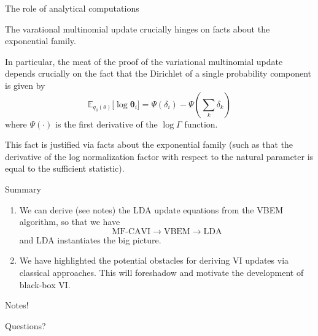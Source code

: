 \documentclass[10pt]{beamer}
\newcommand{\ds}{\displaystyle}
\newcommand{\+}[1]{\ensuremath{{\boldsymbol #1}}} %
\newcommand{\E}{\mathbb{E}}
\newcommand{\biggE}[2]{\E_{{#1}} \bigg[ {{#2}} \bigg]}
\begin{document}
\begin{frame}{The role of analytical computations}

The varational multinomial update crucially hinges on facts about the exponential family.  

In particular, the meat of the proof of the variational multinomial update depends crucially on the fact that the Dirichlet of a single probability component is given by
\begin{equation} \label{dirichlet_expect_prob_component}
 \biggE{q_\delta(\theta)}{\log \+\theta_i} =    \Psi(\delta_{i}) - \Psi (\ds\sum_k \delta_k) 
\end{equation}
where $\Psi(\cdot)$ is the first derivative of the $\log \Gamma$ function. 

This fact is justified via facts about the exponential family (such as that the derivative of the log normalization factor with respect to the natural parameter is equal to the sufficient statistic). 

\end{frame}


\begin{frame}{Summary}


\begin{enumerate}
\item We can derive \tiny (see notes) \normalsize the LDA update equations from the VBEM algorithm, so that we have  
\[ \text{MF-CAVI} \rightarrow \text{VBEM} \rightarrow \text{LDA} \]
and LDA instantiates the big picture.

\item We have highlighted the potential obstacles for deriving VI updates via classical approaches.  This will foreshadow and motivate the development of black-box VI.
\end{enumerate}

\end{frame}

\begin{frame}[standout]
 	Notes!
\end{frame}


\begin{frame}[standout]
  Questions?
\end{frame}
\end{document}
